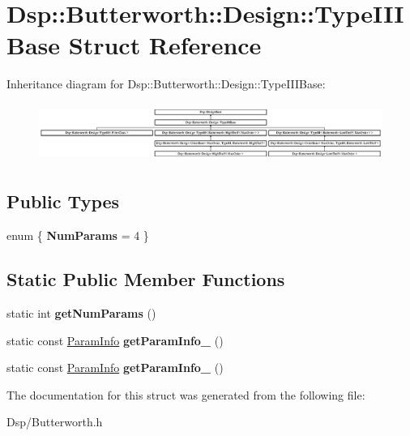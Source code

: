 \hypertarget{structDsp_1_1Butterworth_1_1Design_1_1TypeIIIBase}{\section{Dsp\-:\-:Butterworth\-:\-:Design\-:\-:Type\-I\-I\-I\-Base Struct Reference}
\label{structDsp_1_1Butterworth_1_1Design_1_1TypeIIIBase}
}
Inheritance diagram for Dsp\-:\-:Butterworth\-:\-:Design\-:\-:Type\-I\-I\-I\-Base\-:\begin{figure}[H]
\begin{center}
\leavevmode
\includegraphics[height=1.916496cm]{structDsp_1_1Butterworth_1_1Design_1_1TypeIIIBase}
\end{center}
\end{figure}
\subsection*{Public Types}
\begin{DoxyCompactItemize}
\item 
enum \{ {\bfseries Num\-Params} =  4
 \}
\end{DoxyCompactItemize}
\subsection*{Static Public Member Functions}
\begin{DoxyCompactItemize}
\item 
\hypertarget{structDsp_1_1Butterworth_1_1Design_1_1TypeIIIBase_a6175459406013ad08708ae93ea7ebb97}{static int {\bfseries get\-Num\-Params} ()}\label{structDsp_1_1Butterworth_1_1Design_1_1TypeIIIBase_a6175459406013ad08708ae93ea7ebb97}

\item 
\hypertarget{structDsp_1_1Butterworth_1_1Design_1_1TypeIIIBase_aa630b5d12814e5d86ec3645d46ac188b}{static const \hyperlink{classDsp_1_1ParamInfo}{Param\-Info} {\bfseries get\-Param\-Info\-\_} ()}\label{structDsp_1_1Butterworth_1_1Design_1_1TypeIIIBase_aa630b5d12814e5d86ec3645d46ac188b}

\item 
\hypertarget{structDsp_1_1Butterworth_1_1Design_1_1TypeIIIBase_a1c3a3ae40c480ad87c53b90616eaccd9}{static const \hyperlink{classDsp_1_1ParamInfo}{Param\-Info} {\bfseries get\-Param\-Info\-\_} ()}\label{structDsp_1_1Butterworth_1_1Design_1_1TypeIIIBase_a1c3a3ae40c480ad87c53b90616eaccd9}

\end{DoxyCompactItemize}


The documentation for this struct was generated from the following file\-:\begin{DoxyCompactItemize}
\item 
Dsp/Butterworth.\-h\end{DoxyCompactItemize}
